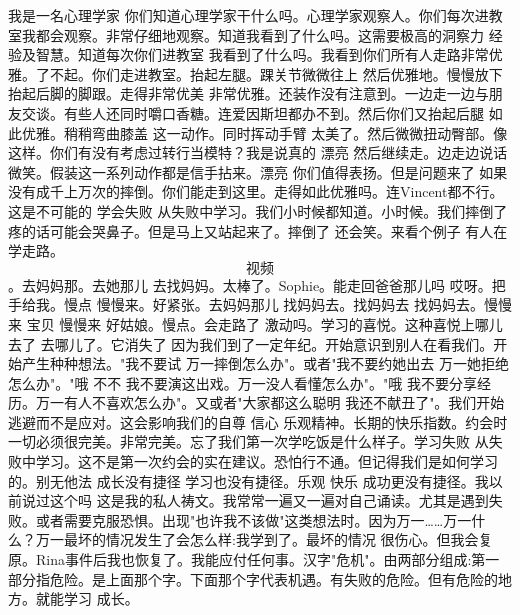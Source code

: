 我是一名心理学家 你们知道心理学家干什么吗。心理学家观察人。你们每次进教室我都会观察。非常仔细地观察。知道我看到了什么吗。这需要极高的洞察力 经验及智慧。知道每次你们进教室 我看到了什么吗。我看到你们所有人走路非常优雅。了不起。你们走进教室。抬起左腿。踝关节微微往上 然后优雅地。慢慢放下 抬起后脚的脚跟。走得非常优美 非常优雅。还装作没有注意到。一边走一边与朋友交谈。有些人还同时嚼口香糖。连爱因斯坦都办不到。然后你们又抬起后腿 如此优雅。稍稍弯曲膝盖 这一动作。同时挥动手臂 太美了。然后微微扭动臀部。像这样。你们有没有考虑过转行当模特？我是说真的 漂亮 然后继续走。边走边说话 微笑。假装这一系列动作都是信手拈来。漂亮 你们值得表扬。但是问题来了 如果没有成千上万次的摔倒。你们能走到这里。走得如此优雅吗。连Vincent都不行。这是不可能的 学会失败 从失败中学习。我们小时候都知道。小时候。我们摔倒了 疼的话可能会哭鼻子。但是马上又站起来了。摔倒了 还会笑。来看个例子 有人在学走路。\[视频\]。去妈妈那。去她那儿 去找妈妈。太棒了。Sophie。能走回爸爸那儿吗 哎呀。把手给我。慢点 慢慢来。好紧张。去妈妈那儿 找妈妈去。找妈妈去 找妈妈去。慢慢来 宝贝 慢慢来 好姑娘。慢点。会走路了 激动吗。学习的喜悦。这种喜悦上哪儿去了 去哪儿了。它消失了 因为我们到了一定年纪。开始意识到别人在看我们。开始产生种种想法。"我不要试 万一摔倒怎么办"。或者"我不要约她出去 万一她拒绝怎么办"。"哦 不不 我不要演这出戏。万一没人看懂怎么办"。"哦 我不要分享经历。万一有人不喜欢怎么办"。又或者"大家都这么聪明 我还不献丑了"。我们开始逃避而不是应对。这会影响我们的自尊 信心 乐观精神。长期的快乐指数。约会时一切必须很完美。非常完美。忘了我们第一次学吃饭是什么样子。学习失败 从失败中学习。这不是第一次约会的实在建议。恐怕行不通。但记得我们是如何学习的。别无他法 成长没有捷径 学习也没有捷径。乐观 快乐 成功更没有捷径。我以前说过这个吗 这是我的私人祷文。我常常一遍又一遍对自己诵读。尤其是遇到失败。或者需要克服恐惧。出现"也许我不该做"这类想法时。因为万一……万一什么？万一最坏的情况发生了会怎么样:我学到了。最坏的情况 很伤心。但我会复原。Rina事件后我也恢复了。我能应付任何事。汉字"危机"。由两部分组成:第一部分指危险。是上面那个字。下面那个字代表机遇。有失败的危险。但有危险的地方。就能学习 成长。 

